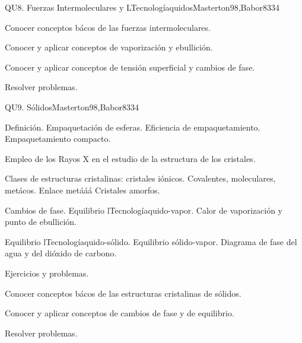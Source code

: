 \begin{syllabus}
\begin{unit}{}{QU8. Fuerzas Intermoleculares y LTecnologíaquidos}{Masterton98,Babor83}{3}{4}
   \begin{learningoutcomes}
      \item Conocer conceptos bácos de las fuerzas intermoleculares.
      \item Conocer y aplicar conceptos de vaporización y ebullición.
      \item Conocer y aplicar conceptos de tensión superficial y cambios de fase.
      \item Resolver problemas.
   \end{learningoutcomes}
\end{unit}

\begin{unit}{}{QU9. Sólidos}{Masterton98,Babor83}{3}{4}
\begin{topics}
      \item Definición. Empaquetación de esferas. Eficiencia de empaquetamiento. Empaquetamiento compacto.
      \item Empleo de los Rayos X en el estudio de la estructura de los cristales.
      \item Clases de estructuras cristalinas: cristales iónicos. Covalentes, moleculares, metácos. Enlace metááá Cristales amorfos.
      \item Cambios de fase. Equilibrio lTecnologíaquido-vapor. Calor de vaporización y punto de ebullición.
      \item Equilibrio lTecnologíaquido-sólido. Equilibrio sólido-vapor. Diagrama de fase  del agua y del dióxido de carbono.
      \item Ejercicios y problemas.
    \end{topics}

   \begin{learningoutcomes}
      \item Conocer conceptos bácos de las estructuras cristalinas de sólidos.
      \item Conocer y aplicar conceptos de cambios de fase y de equilibrio.
      \item Resolver problemas.
   \end{learningoutcomes}
\end{unit}


\end{syllabus}

